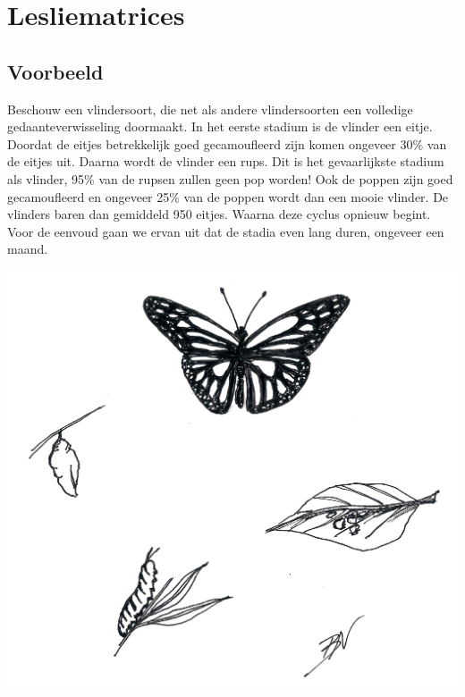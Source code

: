 \documentclass[12pt,twoside]{article}
\begin{document}
\pagebreak
\section{Lesliematrices}

\subsection{Voorbeeld}

\begin{minipage}{.5\linewidth}
Beschouw een vlindersoort, die net als andere vlindersoorten een volledige gedaanteverwisseling doormaakt. In het eerste stadium is de vlinder een eitje. Doordat de eitjes betrekkelijk goed gecamoufleerd zijn komen ongeveer 30\% van de eitjes uit. Daarna wordt de vlinder een rups. Dit is het gevaarlijkste stadium als vlinder, 95\% van de rupsen zullen geen pop worden! Ook de poppen zijn goed gecamoufleerd en ongeveer 25\% van de poppen wordt dan een mooie vlinder. De vlinders baren dan gemiddeld 950 eitjes. Waarna deze cyclus opnieuw begint. Voor de eenvoud gaan we ervan uit dat de stadia even lang duren, ongeveer een maand.
\end{minipage}
\begin{minipage}{.5\linewidth}
  \begin{center}
    \includegraphics[width=\linewidth]{vlinder-cyclus}
  \end{center}
\end{minipage}
\end{document}
